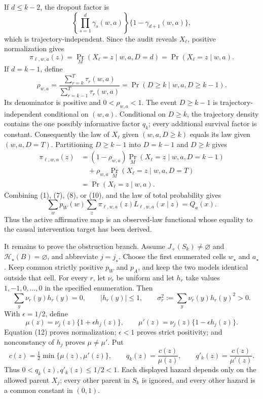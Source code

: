 If \(d\le k-2\), the dropout factor is
\[
\left\{\prod_{s=1}^d\gamma_s(w,a)\right\}
\{1-\gamma_{d+1}(w,a)\},
\]
which is trajectory-independent.  Since the audit reveals \(X_\ell\), positive normalization gives
\[
\pi_{\ell,w,a}(z)
=\Pr_M(X_\ell=z\mid w,a,D=d)
=\Pr(X_\ell=z\mid w,a).
\tag{8}
\]
If \(d=k-1\), define
\[
\rho_{w,a}=
\frac{\sum_{r=k}^T\tau_r(w,a)}{\sum_{r=k-1}^T\tau_r(w,a)}
=\Pr(D\ge k\mid w,a,D\ge k-1).
\tag{9}
\]
Its denominator is positive and \(0<\rho_{w,a}<1\).  The event
\(D\ge k-1\) is trajectory-independent conditional on \((w,a)\).  Conditional on \(D\ge k\), the trajectory density contains the one possibly informative factor \(q_k\); every additional survival factor is constant.  Consequently the law of \(X_\ell\) given \((w,a,D\ge k)\) equals its law given \((w,a,D=T)\).  Partitioning \(D\ge k-1\) into \(D=k-1\) and \(D\ge k\) gives
\[
\begin{aligned}
\pi_{\ell,w,a}(z)
&=(1-\rho_{w,a})\Pr_M(X_\ell=z\mid w,a,D=k-1)\\
&\quad+\rho_{w,a}\Pr_M(X_\ell=z\mid w,a,D=T)\\
&=\Pr(X_\ell=z\mid w,a).
\end{aligned}
\tag{10}
\]
Combining (1), (7), (8), or (10), and the law of total probability gives
\[
\sum_w p_W(w)\sum_z
\pi_{\ell,w,a}(z)L_{\ell,w,a}(x\mid z)=Q_a(x).
\tag{11}
\]
Thus the active affirmative map is an observed-law functional whose equality to the causal intervention target has been derived.

It remains to prove the obstruction branch.  Assume
\(J_+(S_k)\ne\varnothing\) and \(\mathcal H_\star(B)=\varnothing\), and abbreviate \(j=j_\star\).  Choose the first enumerated cells \(w_\star\) and \(a_\star\).  Keep common strictly positive \(p_W\) and \(p_A\), and keep the two models identical outside that cell.  For every \(r\), let \(\nu_r\) be uniform and let \(h_r\) take values \(1,-1,0,\ldots,0\) in the specified enumeration.  Then
\[
\sum_y\nu_r(y)h_r(y)=0,
\qquad |h_r(y)|\le1,
\qquad \sigma_r^2:=\sum_y\nu_r(y)h_r(y)^2>0.
\tag{12}
\]
With \(\epsilon=1/2\), define
\[
\mu(z)=\nu_j(z)\{1+\epsilon h_j(z)\},
\qquad
\mu'(z)=\nu_j(z)\{1-\epsilon h_j(z)\}.
\tag{13}
\]
Equation (12) proves normalization; \(\epsilon<1\) proves strict positivity; and nonconstancy of \(h_j\) proves \(\mu\ne\mu'\).  Put
\[
c(z)=\tfrac12\min\{\mu(z),\mu'(z)\},
\qquad q_k(z)=\frac{c(z)}{\mu(z)},
\qquad q'_k(z)=\frac{c(z)}{\mu'(z)}.
\tag{14}
\]
Thus \(0<q_k(z),q'_k(z)\le1/2<1\).  Each displayed hazard depends only on the allowed parent \(X_j\); every other parent in \(S_k\) is ignored, and every other hazard is a common constant in \((0,1)\).


